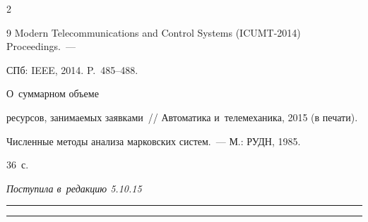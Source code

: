 \begin{multicols}{2}
{{\begin{thebibliography}{9}
Modern Telecommunications and Control Systems (ICUMT-2014) Proceedings.~--- 

СПб: IEEE, 2014. P.~485--488.


 О~суммарном объеме 

ресурсов, занимаемых заявками~// Автоматика и~телемеханика, 2015 (в печати).




 Численные методы анализа марковских систем.~--- М.: РУДН, 1985. 

36~с.







 \end{thebibliography}



 }

 }



\end{multicols}



\vspace*{-12pt}



\hfill{\small\textit{Поступила в~редакцию 5.10.15}}



\vspace*{4pt}









\hrule



\vspace*{2pt}



\hrule



\vspace*{-4pt}



\def\tit{ON PERFORMANCE ANALYSIS OF~MODERN WIRELESS NETWORKS\\[-5pt]}



\def\titkol{On performance analysis of modern wireless networks}




